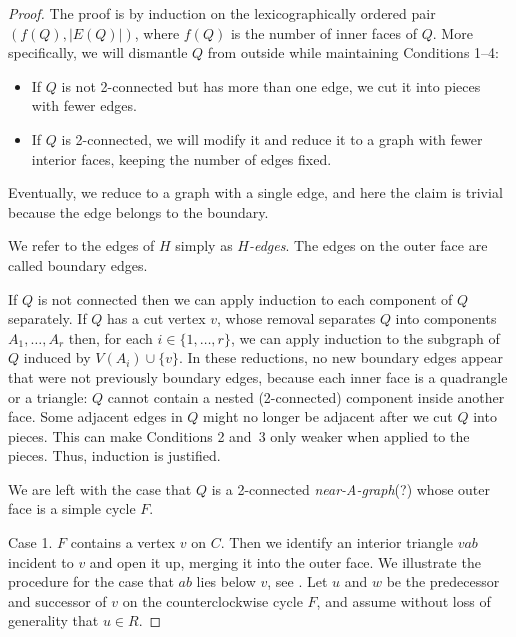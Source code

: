 \begin{proof}
The proof is by induction
   on the lexicographically ordered pair $(f(Q),|E(Q)|)$, where $f(Q)$
is the number of inner faces of $Q$. 
More specifically, %
we will dismantle $Q$
 from outside while maintaining
 Conditions 1--4:
\begin{itemize}
\item If $Q$ is not 2-connected but has more than one edge, we cut it
  into pieces with fewer edges.
\item If $Q$ is 2-connected, we will modify it and reduce it to a
  graph
with fewer interior faces,
keeping the number of edges fixed.
\end{itemize}
Eventually, we reduce to a graph with a single edge, and here the
claim is trivial because the edge belongs to the boundary.

   We refer to the edges of $H$ simply as \emph{$H$-edges}.
The edges on the outer
   face are called boundary edges.

If $Q$ is not connected then we can apply induction to each component
   of $Q$ separately. If $Q$ has a cut vertex $v$, whose removal
   separates $Q$ into components $A_1,\ldots,A_r$ then, for each
   $i\in\{1,\ldots,r\}$, we can apply induction to the subgraph of $Q$
   induced by $V(A_i)\cup\{v\}$.  
In these reductions, no new boundary edges appear that were not
previously boundary edges, because each inner face is
a quadrangle or a triangle: $Q$ cannot contain a nested (2-connected) component
inside another face.
Some adjacent edges in $Q$ might no longer be adjacent
after we cut $Q$ into pieces. This can make Conditions 2 and~3 only weaker
when applied to the pieces. Thus, induction is justified.

We are left with the case that $Q$ is a 2-connected \emph{near-A-graph}(?) whose outer face 
   is a simple cycle $F$.

Case 1. $F$ contains a vertex $v$ on $C$.
Then we identify an interior triangle $vab$ incident to $v$ and open it up,
merging it into the outer face.
We illustrate the procedure for the case that $ab$ lies below $v$, see
.
Let $u$ and $w$ be the predecessor and successor of $v$ on the
counterclockwise cycle $F$, and assume without loss of generality that $u\in R$.


\end{proof}
